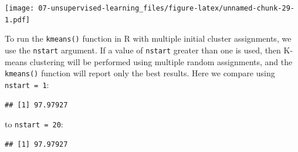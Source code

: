\documentclass[
  openany]{book}
\newenvironment{Shaded}{\begin{snugshade}}{\end{snugshade}}
\newcommand{\DataTypeTok}[1]{\textcolor[rgb]{0.13,0.29,0.53}{#1}}
\newcommand{\DecValTok}[1]{\textcolor[rgb]{0.00,0.00,0.81}{#1}}
\newcommand{\KeywordTok}[1]{\textcolor[rgb]{0.13,0.29,0.53}{\textbf{#1}}}
\newcommand{\NormalTok}[1]{#1}
\newcommand{\OperatorTok}[1]{\textcolor[rgb]{0.81,0.36,0.00}{\textbf{#1}}}
\newcommand{\StringTok}[1]{\textcolor[rgb]{0.31,0.60,0.02}{#1}}
\begin{document}
\begin{Shaded}
\end{Shaded}

\texttt{[image: 07-unsupervised-learning\_files/figure-latex/unnamed-chunk-29-1.pdf]}

To run the \texttt{kmeans()} function in R with multiple initial cluster assignments,
we use the \texttt{nstart} argument. If a value of \texttt{nstart} greater than one
is used, then K-means clustering will be performed using multiple random
assignments, and the \texttt{kmeans()} function will
report only the best results. Here we compare using \texttt{nstart\ =\ 1}:

\begin{Shaded}
\end{Shaded}

\begin{verbatim}
## [1] 97.97927
\end{verbatim}

to \texttt{nstart\ =\ 20}:

\begin{Shaded}
\end{Shaded}

\begin{verbatim}
## [1] 97.97927
\end{verbatim}
\end{document}
